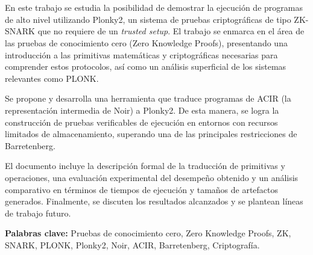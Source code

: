 \chapter*{\tituloTesis}

En este trabajo se estudia la posibilidad de demostrar la ejecución de programas de alto nivel utilizando Plonky2, un sistema de pruebas criptográficas de tipo ZK-SNARK que no requiere de un \textit{trusted setup}. El trabajo se enmarca en el área de las pruebas de conocimiento cero (Zero Knowledge Proofs), presentando una introducción a las primitivas matemáticas y criptográficas necesarias para comprender estos protocolos, así como un análisis superficial de los sistemas relevantes como PLONK.

Se propone y desarrolla una herramienta que traduce programas de ACIR (la representación intermedia de Noir) a Plonky2. De esta manera, se logra la construcción de pruebas verificables de ejecución en entornos con recursos limitados de almacenamiento, superando una de las principales restricciones de Barretenberg.

El documento incluye la descripción formal de la traducción de primitivas y operaciones, una evaluación experimental del desempeño obtenido y un análisis comparativo en términos de tiempos de ejecución y tamaños de artefactos generados. Finalmente, se discuten los resultados alcanzados y se plantean líneas de trabajo futuro. 

\bigskip

\noindent\textbf{Palabras clave:} Pruebas de conocimiento cero, Zero Knowledge Proofs, ZK, SNARK, PLONK, Plonky2, Noir, ACIR, Barretenberg, Criptografía.